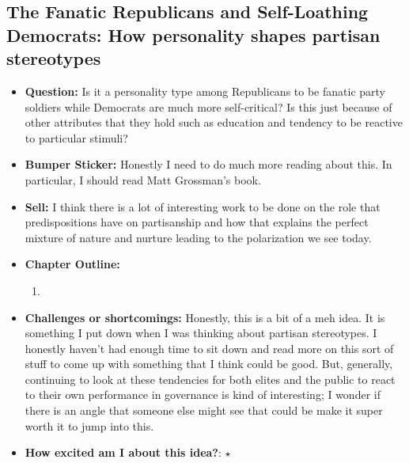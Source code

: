 \documentclass[12pt]{article}
\begin{document}
\subsection{The Fanatic Republicans and Self-Loathing Democrats: How personality shapes partisan stereotypes}
    \begin{itemize}
        \item \textbf{Question:} Is it a personality type among Republicans to be fanatic party soldiers while Democrats are much more self-critical? Is this just because of other attributes that they hold such as education and tendency to be reactive to particular stimuli?
        \item \textbf{Bumper Sticker:} Honestly I need to do much more reading about this. In particular, I should read Matt Grossman's book.
        \item \textbf{Sell:} I think there is a lot of interesting work to be done on the role that predispositions have on partisanship and how that explains the perfect mixture of nature and nurture leading to the polarization we see today.
        \item \textbf{Chapter Outline:}
        \begin{enumerate}
            \item
        \end{enumerate}
        \item \textbf{Challenges or shortcomings:} Honestly, this is a bit of a meh idea. It is something I put down when I was thinking about partisan stereotypes. I honestly haven't had enough time to sit down and read more on this sort of stuff to come up with something that I think could be good. But, generally, continuing to look at these tendencies for both elites and the public to react to their own performance in governance is kind of interesting; I wonder if there is an angle that someone else might see that could be make it super worth it to jump into this.
        \item \textbf{How excited am I about this idea?}: $\star$
    \end{itemize}
\end{document}
